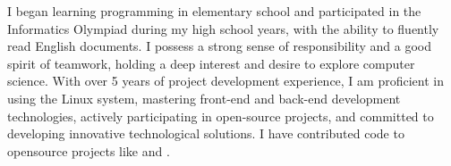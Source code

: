 \documentclass{resume}
\begin{document}
\makeheader

I began learning programming in elementary school and participated in the
Informatics Olympiad during my high school years,
with the ability to fluently read English documents.
I possess a strong sense of responsibility and a good spirit of teamwork,
holding a deep interest and desire to explore computer science.
With over 5 years of project development experience,
I am proficient in using the Linux system,
mastering front-end and back-end development technologies,
actively participating in open-source projects,
and committed to developing innovative technological solutions.
I have contributed code to opensource projects like  and .

\begin{competences}[10em]
\end{competences}


\end{document}
